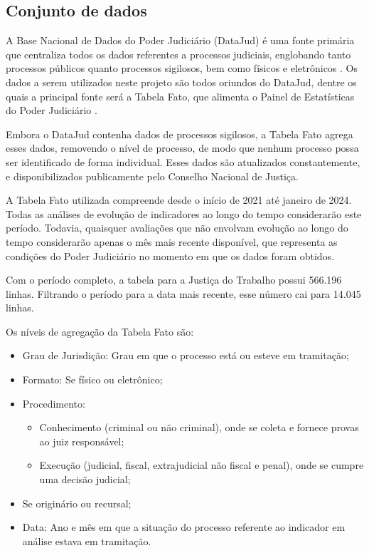 
\subsection{Conjunto de dados}

A Base Nacional de Dados do Poder Judiciário (DataJud) é uma fonte primária que centraliza todos os dados referentes a processos judiciais, englobando tanto processos públicos quanto processos sigilosos, bem como físicos e eletrônicos \cite{datajud}. Os dados a serem utilizados neste projeto são todos oriundos do DataJud, dentre os quais a principal fonte será a Tabela Fato, que alimenta o Painel de Estatísticas do Poder Judiciário \cite{painelestatistica}.

Embora o DataJud contenha dados de processos sigilosos, a Tabela Fato agrega esses dados, removendo o nível de processo, de modo que nenhum processo possa ser identificado de forma individual. Esses dados são atualizados constantemente, e disponibilizados publicamente pelo Conselho Nacional de Justiça.

A Tabela Fato utilizada compreende desde o início de 2021 até janeiro de 2024. Todas as análises de evolução de indicadores ao longo do tempo considerarão este período. Todavia, quaisquer avaliações que não envolvam evolução ao longo do tempo considerarão apenas o mês mais recente disponível, que representa as condições do Poder Judiciário no momento em que os dados foram obtidos.

Com o período completo, a tabela para a Justiça do Trabalho possui 566.196 linhas. Filtrando o período para a data mais recente, esse número cai para 14.045 linhas.

Os níveis de agregação da Tabela Fato são:
    
\begin{itemize}
    \item Grau de Jurisdição: Grau em que o processo está ou esteve em tramitação;
    \item Formato: Se físico ou eletrônico;
    \item Procedimento:
    \begin{itemize}
        \item Conhecimento (criminal ou não criminal), onde se coleta e fornece provas ao juiz responsável;
        \item Execução (judicial, fiscal, extrajudicial não fiscal e penal), onde se cumpre uma decisão judicial;
    \end{itemize}
    \item Se originário ou recursal;
    \item Data: Ano e mês em que a situação do processo referente ao indicador em análise estava em tramitação.
\end{itemize}

